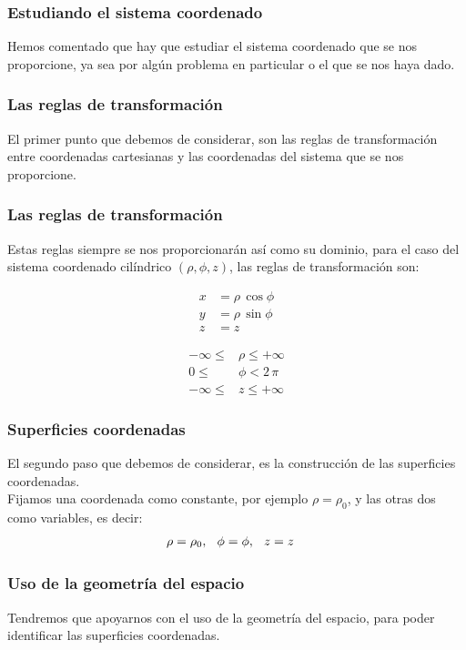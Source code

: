 \documentclass[12pt]{beamer}
\begin{document}
\begin{frame}
\frametitle{Estudiando el sistema coordenado}
Hemos comentado que hay que estudiar el sistema coordenado que se nos proporcione, ya sea por algún problema en particular o el que se nos haya dado.
\end{frame}
\begin{frame}
\frametitle{Las reglas de transformación}
El primer punto que debemos de considerar, son las reglas de transformación entre coordenadas cartesianas y las coordenadas del sistema que se nos proporcione.
\end{frame}
\begin{frame}
\frametitle{Las reglas de transformación}
Estas reglas siempre se nos proporcionarán así como su dominio, \pause para el caso del sistema coordenado cilíndrico $(\rho, \phi, z)$, las reglas de transformación son:
\pause
\begin{minipage}[t]{0.4\linewidth}
\begin{align*}
x &= \rho \, \cos \phi \\[0.5em]
y &= \rho \, \sin \phi \\[0.5em]
z &= z
\end{align*}
\end{minipage}
\begin{minipage}[t]{0.4\linewidth}
\begin{align*}
   -\infty \leq &\rho \leq +\infty \\[0.5em]
   0 \leq &\phi < 2 \, \pi \\[0.5em]
   -\infty \leq &z \leq +\infty
\end{align*}
\end{minipage}
\end{frame}
\begin{frame}
\frametitle{Superficies coordenadas}
El segundo paso que debemos de considerar, es la construcción de las superficies coordenadas.
\\
\bigskip
\pause
Fijamos una coordenada como constante, por ejemplo $\rho = \rho_{0}$, y las otras dos como variables, es decir:
\begin{align*}
\rho &= \rho_{0}, \hspace{0.25cm} \phi = \phi, \hspace{0.25cm} z = z
\end{align*}
\end{frame}
\begin{frame}
\frametitle{Uso de la geometría del espacio}
Tendremos que apoyarnos con el uso de la geometría del espacio, para poder identificar las superficies coordenadas.
\end{frame}
\end{document}
